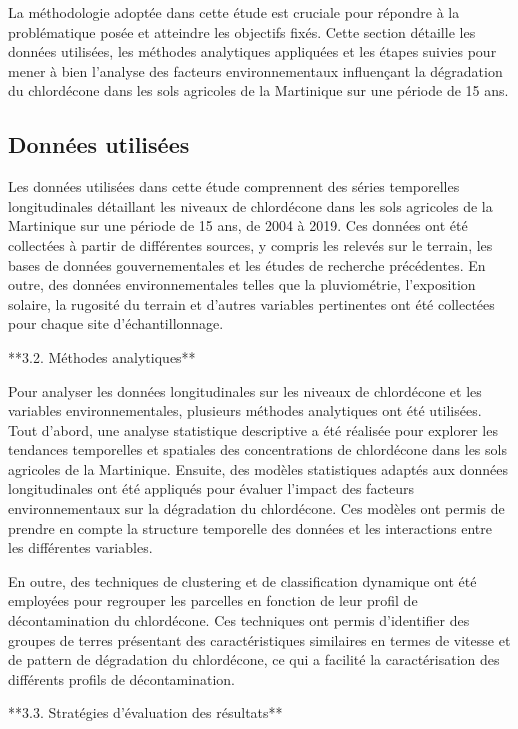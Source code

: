 \documentclass{report}
\begin{document}
La méthodologie adoptée dans cette étude est cruciale pour répondre à la problématique posée et atteindre les objectifs fixés. Cette section détaille les données utilisées, les méthodes analytiques appliquées et les étapes suivies pour mener à bien l'analyse des facteurs environnementaux influençant la dégradation du chlordécone dans les sols agricoles de la Martinique sur une période de 15 ans.

\subsection{Données utilisées}

Les données utilisées dans cette étude comprennent des séries temporelles longitudinales détaillant les niveaux de chlordécone dans les sols agricoles de la Martinique sur une période de 15 ans, de 2004 à 2019. Ces données ont été collectées à partir de différentes sources, y compris les relevés sur le terrain, les bases de données gouvernementales et les études de recherche précédentes. En outre, des données environnementales telles que la pluviométrie, l'exposition solaire, la rugosité du terrain et d'autres variables pertinentes ont été collectées pour chaque site d'échantillonnage.

**3.2. Méthodes analytiques**

Pour analyser les données longitudinales sur les niveaux de chlordécone et les variables environnementales, plusieurs méthodes analytiques ont été utilisées. Tout d'abord, une analyse statistique descriptive a été réalisée pour explorer les tendances temporelles et spatiales des concentrations de chlordécone dans les sols agricoles de la Martinique. Ensuite, des modèles statistiques adaptés aux données longitudinales ont été appliqués pour évaluer l'impact des facteurs environnementaux sur la dégradation du chlordécone. Ces modèles ont permis de prendre en compte la structure temporelle des données et les interactions entre les différentes variables.

En outre, des techniques de clustering et de classification dynamique ont été employées pour regrouper les parcelles en fonction de leur profil de décontamination du chlordécone. Ces techniques ont permis d'identifier des groupes de terres présentant des caractéristiques similaires en termes de vitesse et de pattern de dégradation du chlordécone, ce qui a facilité la caractérisation des différents profils de décontamination.

**3.3. Stratégies d'évaluation des résultats**
\end{document}
